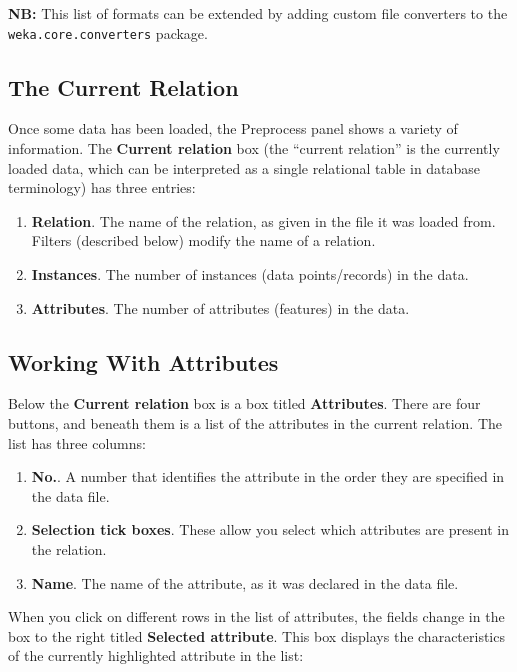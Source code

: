\textbf{NB:} This list of formats can be extended by adding custom file 
converters to the \texttt{weka.core.converters} package.

\subsection{The Current Relation}

Once some data has been loaded, the Preprocess panel shows a variety
of information.  The \textbf{Current relation} box (the ``current
relation'' is the currently loaded data, which can be interpreted as a
single relational table in database terminology)  has three entries:

\begin{enumerate}
\item \textbf{Relation}.
The name of the relation, as given in the file it was loaded from. Filters
(described below) modify the name of a relation. 
\item \textbf{Instances}.
The number of instances (data points/records) in the data.
\item \textbf{Attributes}.
The number of attributes (features) in the data.
\end{enumerate}

\subsection{Working With Attributes}

Below the \textbf{Current relation} box is a box titled \textbf{Attributes}.
There are four buttons, and beneath them is a list of the attributes in the
current relation. The list has three columns:

\begin{enumerate}
\item \textbf{No.}.
A number that identifies the attribute in the order they are specified in the
data file. 
\item \textbf{Selection tick boxes}.
These allow you select which attributes are present in the relation.
\item \textbf{Name}.
The name of the attribute, as it was declared in the data file.
\end{enumerate}

When you click on different rows in the list of attributes, the fields
change in the box to the right titled \textbf{Selected
attribute}. This box displays the characteristics of the currently
highlighted attribute in the list:

